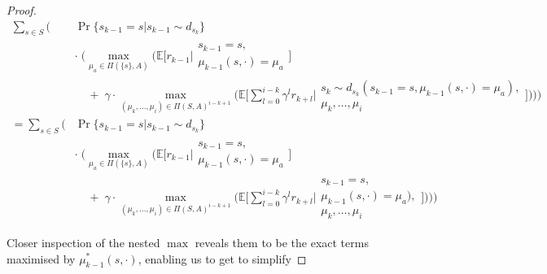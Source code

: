 \documentclass[11pt]{article} %
\begin{document}
\begin{proof}
\begin{equation}
	\begin{array}{rll}
		\sum\limits_{s \in S} \Big(	& \Pr\{ s_{k-1} = s | s_{k-1} \sim d_{s_k}\} \\
									& \cdot \; \Big( \max\limits_{\mu_a \in \Pi(\{s\},A)} \Big(\mathbb{E} \Big[ r_{k-1} \Big| \begin{array}{c}
																													s_{k-1} = s, \\
																													\mu_{k-1}(s,\cdot) = \mu_a
																												\end{array} \Big] \\
									& \; \; \; \; + \; \gamma \cdot \max\limits_{(\mu_k,\dots,\mu_i) \in \Pi(S,A)^{i-k+1}} \Big( \mathbb{E}\Big[ \sum\limits_{l=0}^{i-k} \gamma^l r_{k+l} \Big| \begin{array}{c}
																																																s_k \sim d_{s_k}(s_{k-1} = s,\mu_{k-1}(s,\cdot) = \mu_a), \\
																																																\mu_k,\dots,\mu_i
																																															\end{array} \Big] \Big) \Big) \Big) \\
		 = \sum\limits_{s \in S} \Big(	& \Pr\{ s_{k-1} = s | s_{k-1} \sim d_{s_k}\} \\
									& \cdot \; \Big( \max\limits_{\mu_a \in \Pi(\{s\},A)} \Big(\mathbb{E} \Big[ r_{k-1} \Big| \begin{array}{c}
																													s_{k-1} = s, \\
																													\mu_{k-1}(s,\cdot) = \mu_a
																												\end{array} \Big] \\
									& \; \; \; \; + \; \gamma \cdot \max\limits_{(\mu_k,\dots,\mu_i) \in \Pi(S,A)^{i-k+1}} \Big( \mathbb{E}\Big[ \sum\limits_{l=0}^{i-k} \gamma^l r_{k+l} \Big| \begin{array}{c}
																																																s_{k-1} = s, \\
																																																\mu_{k-1}(s,\cdot) = \mu_a), \\
																																																\mu_k,\dots,\mu_i
																																															\end{array} \Big] \Big) \Big) \Big)
	\end{array}
\end{equation}

Closer inspection of the nested $\max$ reveals them to be the exact terms maximised by $\mu_{k-1}^*(s,\cdot)$, enabling us to get to simplify


\end{proof}
\end{document}
